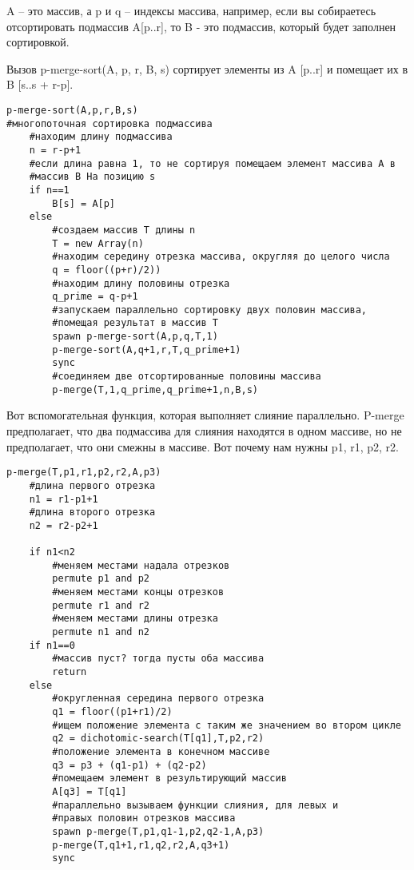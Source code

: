 A -- это массив, а p и q -- индексы массива, например, если вы собираетесь отсортировать подмассив A[p..r], то B - это подмассив, который будет заполнен сортировкой.

\vspace{\baselineskip}

Вызов p-merge-sort(A, p, r, B, s) сортирует элементы из A [p..r] и помещает их в B [s..s + r-p].

\begin{tcolorbox}
\begin{verbatim}
p-merge-sort(A,p,r,B,s)
#многопоточная сортировка подмассива
	#находим длину подмассива
	n = r-p+1
	#если длина равна 1, то не сортируя помещаем элемент массива A в 
	#массив B На позицию s
	if n==1
		B[s] = A[p]
	else
		#создаем массив T длины n
		T = new Array(n) 
		#находим середину отрезка массива, округляя до целого числа
		q = floor((p+r)/2))
		#находим длину половины отрезка
		q_prime = q-p+1
		#запускаем параллельно сортировку двух половин массива, 
		#помещая результат в массив T
		spawn p-merge-sort(A,p,q,T,1)
		p-merge-sort(A,q+1,r,T,q_prime+1)
		sync
		#соединяем две отсортированные половины массива
		p-merge(T,1,q_prime,q_prime+1,n,B,s)
\end{verbatim}
\end{tcolorbox}

Вот вспомогательная функция, которая выполняет слияние параллельно. P-merge предполагает, что два подмассива для слияния находятся в одном массиве, но не предполагает, что они смежны в массиве. Вот почему нам нужны p1, r1, p2, r2.

\begin{tcolorbox}
\begin{verbatim}
p-merge(T,p1,r1,p2,r2,A,p3)
	#длина первого отрезка
	n1 = r1-p1+1
	#длина второго отрезка
	n2 = r2-p2+1

	if n1<n2
		#меняем местами надала отрезков
		permute p1 and p2
		#меняем местами концы отрезков
		permute r1 and r2
		#меняем местами длины отрезка
		permute n1 and n2
	if n1==0
		#массив пуст? тогда пусты оба массива
		return
	else
		#округленная середина первого отрезка
		q1 = floor((p1+r1)/2)
		#ищем положение элемента с таким же значением во втором цикле
		q2 = dichotomic-search(T[q1],T,p2,r2)
		#положение элемента в конечном массиве
		q3 = p3 + (q1-p1) + (q2-p2)
		#помещаем элемент в результирующий массив 
		A[q3] = T[q1]
		#параллельно вызываем функции слияния, для левых и 
		#правых половин отрезков массива
		spawn p-merge(T,p1,q1-1,p2,q2-1,A,p3)
		p-merge(T,q1+1,r1,q2,r2,A,q3+1)
		sync
\end{verbatim}
\end{tcolorbox}

